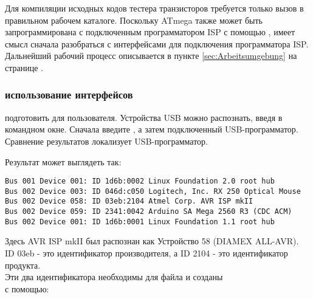 Для компиляции исходных кодов тестера транзисторов требуется только вызов 
в правильном рабочем каталоге.
Поскольку ATmega также может быть запрограммирована с подключенным
программатором ISP с помощью ,
имеет смысл сначала разобраться с интерфейсами для подключения программатора ISP.
Дальнейший рабочий процесс описывается в пункте \ref{sec:Arbeitsumgebung} на
странице \pageref{sec:Arbeitsumgebung}. 


\subsubsection{использование интерфейсов}
подготовить для пользователя.
Устройства USB можно распознать, введя  в командном окне.
Сначала введите , а затем подключенный USB-программатор. \\
Сравнение результатов локализует USB-программатор.

Результат  может выглядеть так:
\begin{footnotesize} \begin{verbatim}
Bus 001 Device 001: ID 1d6b:0002 Linux Foundation 2.0 root hub
Bus 002 Device 003: ID 046d:c050 Logitech, Inc. RX 250 Optical Mouse
Bus 002 Device 058: ID 03eb:2104 Atmel Corp. AVR ISP mkII
Bus 002 Device 059: ID 2341:0042 Arduino SA Mega 2560 R3 (CDC ACM)
Bus 002 Device 001: ID 1d6b:0001 Linux Foundation 1.1 root hub
\end{verbatim} \end{footnotesize}
Здесь AVR ISP mkII был распознан как Устройство 58 (DIAMEX ALL-AVR). \\
ID 03eb - это идентификатор производителя, а ID 2104 - это идентификатор продукта. \\
Эти два идентификатора необходимы для файла  и созданы \\
с помощью:

